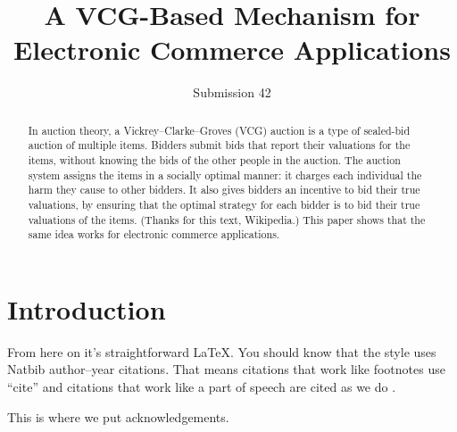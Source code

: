 \documentclass[format=acmsmall, review=false]{acmart}
\begin{document}
\title[A VCG-Based Mechanism for Electronic Commerce]{A VCG-Based Mechanism for Electronic Commerce Applications}  
\author{Submission 42}

\begin{abstract}
In auction theory, a Vickrey--Clarke--Groves (VCG) auction is a type of sealed-bid auction of multiple items. Bidders submit bids that report their valuations for the items, without knowing the bids of the other people in the auction. The auction system assigns the items in a socially optimal manner: it charges each individual the harm they cause to other bidders. It also gives bidders an incentive to bid their true valuations, by ensuring that the optimal strategy for each bidder is to bid their true valuations of the items. (Thanks for this text, Wikipedia.) This paper shows that the same idea works for electronic commerce applications.
\end{abstract}

\maketitle


\section{Introduction}

From here on it's straightforward \LaTeX. You should know that the style uses Natbib author--year citations. 
That means citations that work like footnotes use ``cite'' \cite{Abril07} and citations that work like a part of speech
are cited as we do \citet{Abril07}.

\begin{acks}
	
This is where we put acknowledgements.
\end{acks}



\end{document}
